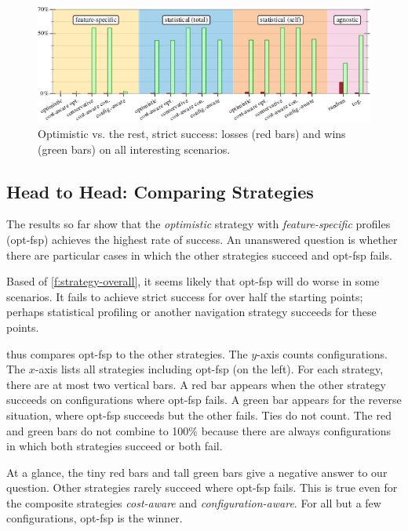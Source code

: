 \begin{figure}[ht]
  \includegraphics[width=0.9\columnwidth]{data/head-to-head.pdf}
  \caption{Optimistic vs. the rest, strict success: losses (red bars) and wins (green bars) on all interesting scenarios.}
  \label{f:head-to-head}
\end{figure}

\subsection{Head to Head: Comparing Strategies} \label{s:hh}

The results so far show that the \emph{optimistic} strategy
with \emph{feature-specific} profiles (opt-fsp) achieves the highest rate
of success.
An unanswered question is whether there are particular cases in which
the other strategies succeed and opt-fsp fails.

Based of \cref{f:strategy-overall}, it seems likely that opt-fsp will do
worse in some scenarios.
It fails to achieve strict success for over half the starting points;
perhaps statistical profiling or another navigation strategy succeeds
for these points.

 thus compares opt-fsp to the other strategies.
The $y$-axis counts configurations.
The $x$-axis lists all strategies including opt-fsp (on the left).
For each strategy, there are at most two vertical bars.
A red bar appears when the other strategy succeeds on configurations
where opt-fsp fails.
A green bar appears for the reverse situation, where opt-fsp succeeds
but the other fails.
Ties do not count.
The red and green bars do not combine to 100\% because there are always configurations
in which both strategies succeed or both fail.

At a glance, the tiny red bars and tall green bars give a negative answer to our question.
Other strategies rarely succeed where opt-fsp fails.
This is true even for the composite strategies \emph{cost-aware} and \emph{configuration-aware}.
For all but a few configurations, opt-fsp is the winner.
